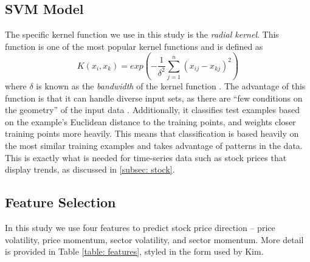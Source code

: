 \documentclass[pageno]{jpaper}
\begin{document}
\subsection{SVM Model}

The specific kernel function we use in this study is the {\em radial kernel}. This function is one of the most popular kernel functions and is defined as 
$$K(x_i, x_k) = exp\left(-\frac{1}{\delta^2}\sum_{j=1}^n(x_{ij}-x_{kj})^2\right)$$
where $\delta$ is known as the {\em bandwidth} of the kernel function \cite{kim}. The advantage of this function is that it can handle diverse input sets, as there are ``few conditions on the geometry'' of the input data \cite{buhmann}. Additionally, it classifies test examples based on the example's Euclidean distance to the training points, and weights closer training points more heavily. This means that classification is based heavily on the most similar training examples and takes advantage of patterns in the data. This is exactly what is needed for time-series data such as stock prices that display trends, as discussed in \ref{subsec: stock}.

\subsection{Feature Selection}
In this study we use four features to predict stock price direction -- price volatility, price momentum, sector volatility, and sector momentum. More detail is provided in Table \ref{table: features}, styled in the form used by Kim\cite{kim}.
\end{document}
